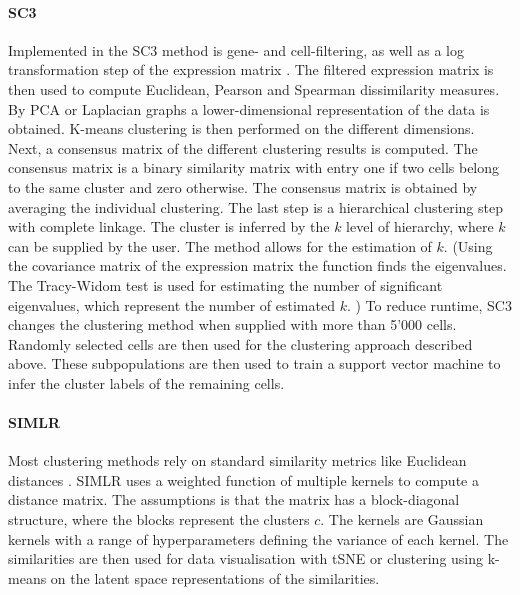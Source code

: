 \documentclass[12pt, a4paper]{article}\usepackage[]{graphicx}\usepackage[]{color}
\begin{document}
\paragraph{SC3}
Implemented in the SC3 method is gene- and cell-filtering, as well as a log transformation step of the expression matrix \citep{kiselev2017sc3}. The filtered expression matrix is then used to compute  Euclidean, Pearson and  Spearman dissimilarity measures. By PCA or Laplacian graphs a lower-dimensional representation of the data is obtained.  K-means clustering is then performed on the different dimensions. Next, a consensus matrix of the different clustering results is computed. The consensus matrix is a binary similarity matrix with entry one if two cells belong to the same cluster and zero otherwise. The consensus matrix is obtained by averaging the individual clustering. The last step is a hierarchical clustering step with complete linkage. The cluster is inferred by the $k$ level of hierarchy, where $k$ can be supplied by the user. The method allows for the estimation of $k$. (Using the covariance matrix of the expression matrix the function finds the eigenvalues. The Tracy-Widom test is used for estimating the number of significant eigenvalues, which represent the number of estimated $k$. )
To reduce runtime, SC3 changes the clustering method when supplied with more than 5'000 cells. Randomly selected cells are then used for the clustering approach described above. These subpopulations are then used to train a support vector machine to infer the cluster labels of the remaining cells.

\paragraph{SIMLR}
Most clustering methods rely on standard similarity metrics like Euclidean distances \citep{wang2017visualization}. SIMLR uses a weighted function of multiple kernels to compute a distance matrix. The assumptions is that the matrix has a block-diagonal structure, where the blocks represent the clusters $c$. The kernels are Gaussian kernels with a range of hyperparameters defining the variance of each kernel. The similarities are then used for data visualisation with tSNE or clustering using k-means on the latent space representations of the similarities.
\end{document}
